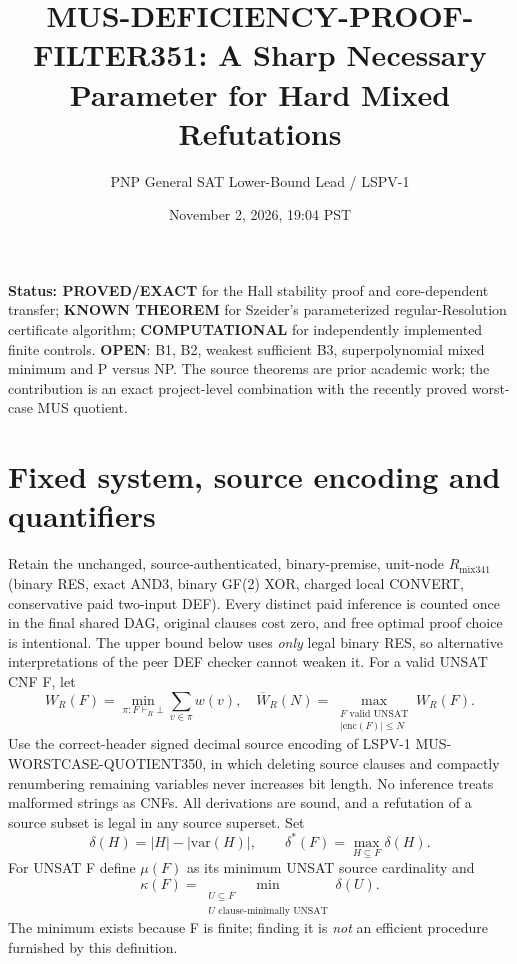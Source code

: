 \documentclass[11pt]{article}
\title{MUS-DEFICIENCY-PROOF-FILTER351: A Sharp Necessary Parameter for Hard Mixed Refutations}
\author{PNP General SAT Lower-Bound Lead / LSPV-1}
\date{November 2, 2026, 19:04 PST}
\begin{document}
\maketitle
\noindent\textbf{Status: PROVED/EXACT} for the Hall stability proof and core-dependent transfer; \textbf{KNOWN THEOREM} for Szeider's parameterized regular-Resolution certificate algorithm; \textbf{COMPUTATIONAL} for independently implemented finite controls. \textbf{OPEN}: B1, B2, weakest sufficient B3, superpolynomial mixed minimum and P versus NP. The source theorems are prior academic work; the contribution is an exact project-level combination with the recently proved worst-case MUS quotient.

\section*{Fixed system, source encoding and quantifiers}
Retain the unchanged, source-authenticated, binary-premise, unit-node $R_{\mathrm{mix341}}$ (binary RES, exact AND3, binary GF(2) XOR, charged local CONVERT, conservative paid two-input DEF). Every distinct paid inference is counted once in the final shared DAG, original clauses cost zero, and free optimal proof choice is intentional. The upper bound below uses \emph{only} legal binary RES, so alternative interpretations of the peer DEF checker cannot weaken it. For a valid UNSAT CNF F, let
\[
W_R(F)=\min_{\pi:F\vdash_R\bot}\sum_{v\in\pi}w(v),\quad
\overline W_R(N)=\max_{\substack{F\text{ valid UNSAT}\\|\mathrm{enc}(F)|\le N}}W_R(F).
\]
Use the correct-header signed decimal source encoding of LSPV-1 MUS-WORSTCASE-QUOTIENT350, in which deleting source clauses and compactly renumbering remaining variables never increases bit length. No inference treats malformed strings as CNFs. All derivations are sound, and a refutation of a source subset is legal in any source superset. Set
\[
\delta(H)=|H|-|\mathrm{var}(H)|,\qquad
\delta^*(F)=\max_{H\subseteq F}\delta(H).
\]
For UNSAT F define $\mu(F)$ as its minimum UNSAT source cardinality and
\[
\kappa(F)=\min_{\substack{U\subseteq F\\ U\text{ clause-minimally UNSAT}}}\delta(U).
\]
The minimum exists because F is finite; finding it is \emph{not} an efficient procedure furnished by this definition.
\end{document}
